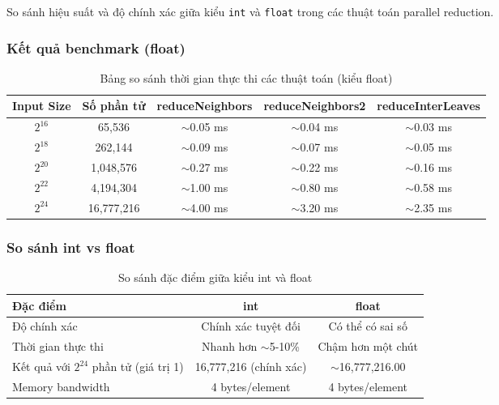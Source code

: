 \documentclass[12pt,a4paper]{article}
\begin{document}
So sánh hiệu suất và độ chính xác giữa kiểu \texttt{int} và \texttt{float} trong các thuật toán parallel reduction.

\subsubsection{Kết quả benchmark (float)}

\begin{table}[h]
\centering
\caption{Bảng so sánh thời gian thực thi các thuật toán (kiểu float)}
\label{tab:benchmark_float}
\begin{tabular}{|c|c|c|c|c|}
\hline
\textbf{Input Size} & \textbf{Số phần tử} & \textbf{reduceNeighbors} & \textbf{reduceNeighbors2} & \textbf{reduceInterLeaves} \\
\hline
$2^{16}$ & 65,536 & $\sim$0.05 ms & $\sim$0.04 ms & $\sim$0.03 ms \\
\hline
$2^{18}$ & 262,144 & $\sim$0.09 ms & $\sim$0.07 ms & $\sim$0.05 ms \\
\hline
$2^{20}$ & 1,048,576 & $\sim$0.27 ms & $\sim$0.22 ms & $\sim$0.16 ms \\
\hline
$2^{22}$ & 4,194,304 & $\sim$1.00 ms & $\sim$0.80 ms & $\sim$0.58 ms \\
\hline
$2^{24}$ & 16,777,216 & $\sim$4.00 ms & $\sim$3.20 ms & $\sim$2.35 ms \\
\hline
\end{tabular}
\end{table}

\subsubsection{So sánh int vs float}

\begin{table}[h]
\centering
\caption{So sánh đặc điểm giữa kiểu int và float}
\label{tab:int_vs_float}
\begin{tabular}{|l|c|c|}
\hline
\textbf{Đặc điểm} & \textbf{int} & \textbf{float} \\
\hline
Độ chính xác & Chính xác tuyệt đối & Có thể có sai số \\
\hline
Thời gian thực thi & Nhanh hơn $\sim$5-10\% & Chậm hơn một chút \\
\hline
Kết quả với $2^{24}$ phần tử (giá trị 1) & 16,777,216 (chính xác) & $\sim$16,777,216.00 \\
\hline
Memory bandwidth & 4 bytes/element & 4 bytes/element \\
\hline
\end{tabular}
\end{table}
\end{document}
